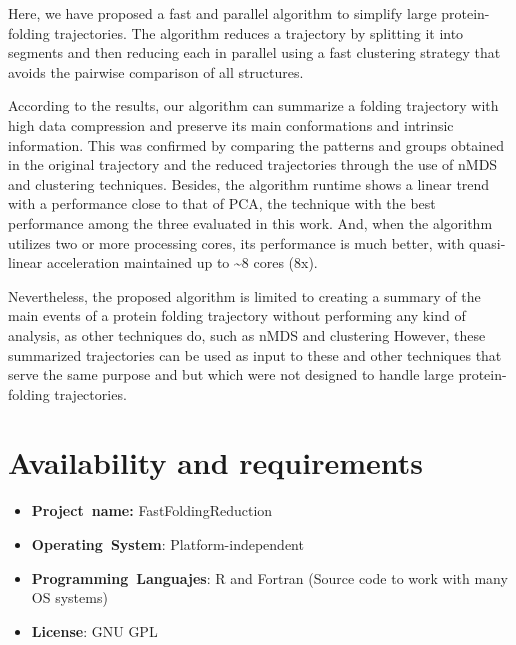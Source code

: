 \documentclass[twocolumn]{bmcart}%
\begin{document}
Here, we have proposed a fast and parallel algorithm to simplify large protein-folding trajectories. The algorithm reduces a trajectory by splitting it into segments and then reducing each in parallel using a fast clustering strategy that avoids the pairwise comparison of all structures.

According to the results, our algorithm can summarize a folding trajectory with high data compression and preserve its main conformations and intrinsic information. This was confirmed by comparing the patterns and groups obtained in the original trajectory and the reduced trajectories through the use of nMDS and clustering techniques. Besides, the algorithm runtime shows a linear trend with a performance close to that of PCA, the technique with the best performance among the three evaluated in this work. And, when the algorithm utilizes two or more processing cores, its performance is much better, with quasi-linear acceleration maintained up to \textasciitilde{}8 cores (8x).

Nevertheless, the proposed algorithm is limited to creating a summary of the main events of a protein folding trajectory without performing any kind of analysis, as other techniques do, such as nMDS and clustering However, these summarized trajectories can be used as input to these and other techniques that serve the same purpose and but which were not designed to handle large protein- folding trajectories.


\section*{Availability and requirements}
\begin{itemize}
\item \textbf{Project~name:} FastFoldingReduction
\item \textbf{Operating~System}: Platform-independent
\item \textbf{Programming~Languajes}: R and Fortran (Source code to work with many OS systems)
\item \textbf{License}: GNU GPL
\end{itemize}

\end{document}

